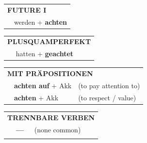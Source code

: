 \documentclass[10pt,a4paper]{revtex4-2}
\begin{document}
\begin{verbbox}
\begin{tabular}{rl}
    \multicolumn{2}{l}{\textbf{FUTURE I} }\\
   & werden + \textbf{achten}\\
 
  \end{tabular}
\hfill
   \begin{tabular}{rl}
      \multicolumn{2}{l}{\textbf{PLUSQUAMPERFEKT}}\\
   & hatten + \textbf{geachtet}\\
  \end{tabular}

   \vspace{10pt}

   \begin{tabular}{lll}
      \multicolumn{3}{l}{\textbf{MIT PRÄPOSITIONEN}}\\
& \textbf{achten auf} + Akk & (to pay attention to)\\
& \textbf{achten} + Akk & (to respect / value)\\
\end{tabular}
  \hfill
   \begin{tabular}{lll}
      \multicolumn{3}{l}{\textbf{TRENNBARE VERBEN}}\\
 & \textbf{---} & (none common)\\
\vspace{10pt}
  \end{tabular}


  \vspace{-5pt}


\end{verbbox}
\end{document}
